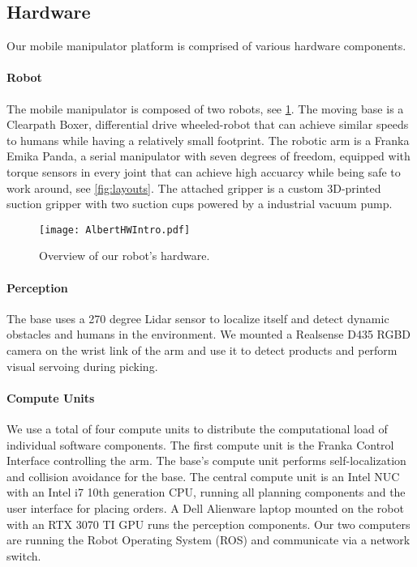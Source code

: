 \subsection{Hardware}
\label{sec:hardware}

Our mobile manipulator platform is comprised of various hardware components. 

\paragraph{Robot}
The mobile manipulator is composed of two robots, see
\cref{fig:hardware}. The moving base is a Clearpath Boxer,
differential drive wheeled-robot that can achieve similar
speeds to humans while having a relatively small footprint.
The robotic arm is a
Franka Emika Panda, a serial manipulator with seven degrees
of freedom, equipped with torque sensors in every joint that
can achieve high accuarcy while being safe to work around,
see \cref{fig:layouts}. The attached gripper is a custom
3D-printed suction gripper with two suction cups powered by
a industrial vacuum pump.
\begin{figure}[t]
    \centering
    \texttt{[image: AlbertHWIntro.pdf]}
    \caption{Overview of our robot's hardware.}
    \label{fig:hardware}
\end{figure}


\paragraph{Perception}
The base uses a 270 degree Lidar sensor to localize itself
and detect dynamic obstacles and humans in the environment.
We mounted a Realsense D435 RGBD camera on the wrist link of
the arm and use it to detect products and perform visual
servoing during picking.

\paragraph{Compute Units}
We use a total of four compute units to distribute the computational load of individual software components. 
The first compute unit is the Franka Control Interface controlling the arm. 
The base's compute unit performs
self-localization and collision avoidance for the base.
The central compute
unit is an Intel NUC with an Intel i7 10th generation CPU, running all planning components and the user interface for placing orders. 
A Dell Alienware laptop mounted on the robot with an RTX 3070 TI GPU runs the perception components. %
Our two computers are running the Robot Operating System (ROS) and communicate via a network switch.
